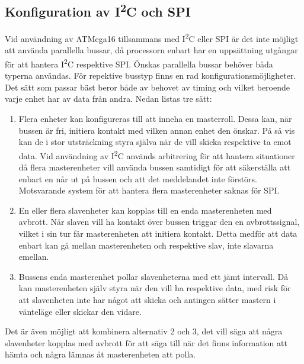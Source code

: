 \documentclass[11pt]{article}
\begin{document}
\begin{flushleft}
\subsection{Konfiguration av I\textsuperscript{2}C och SPI}

Vid användning av ATMega16 tillsammans med I\textsuperscript{2}C eller SPI är det inte möjligt att använda parallella bussar, då processorn enbart har en uppsättning utgångar för att hantera I\textsuperscript{2}C respektive SPI. Önskas parallella bussar behöver båda typerna användas. För repektive busstyp finns en rad konfigurationsmöjligheter. Det sätt som passar bäst beror både av behovet av timing och vilket beroende varje enhet har av data från andra. Nedan listas tre sätt:

\begin{enumerate}
 \item Flera enheter kan konfigureras till att inneha en masterroll. Dessa kan, när bussen är fri, initiera kontakt med vilken annan enhet den önskar. På så vis kan de i stor utsträckning styra själva när de vill skicka respektive ta emot data. Vid användning av I\textsuperscript{2}C används arbitrering för att hantera situationer då flera masterenheter vill använda bussen samtidigt för att säkerställa att enbart en når ut på bussen och att det meddelandet inte förstörs. \cite{guideI2C} Motsvarande system för att hantera flera masterenheter saknas för SPI.
 
 \item En eller flera slavenheter kan kopplas till en enda masterenheten med avbrott. När slaven vill ha kontakt över bussen triggar den en avbrottssignal, vilket i sin tur får masterenheten att initiera kontakt. Detta medför att data enbart kan gå mellan masterenheten och respektive slav, inte slavarna emellan.
 
 \item Bussens enda masterenhet pollar slavenheterna med ett jämt intervall. Då kan masterenheten själv styra när den vill ha respektive  data, med risk för att slavenheten inte har något att skicka och antingen sätter mastern i vänteläge eller skickar den vidare.
\end{enumerate}

Det är även möjligt att kombinera alternativ 2 och 3, det vill säga att några slavenheter kopplas med avbrott för att säga till när det finns information att hämta och några lämnas åt masterenheten att polla.


\end{flushleft}
\end{document}
